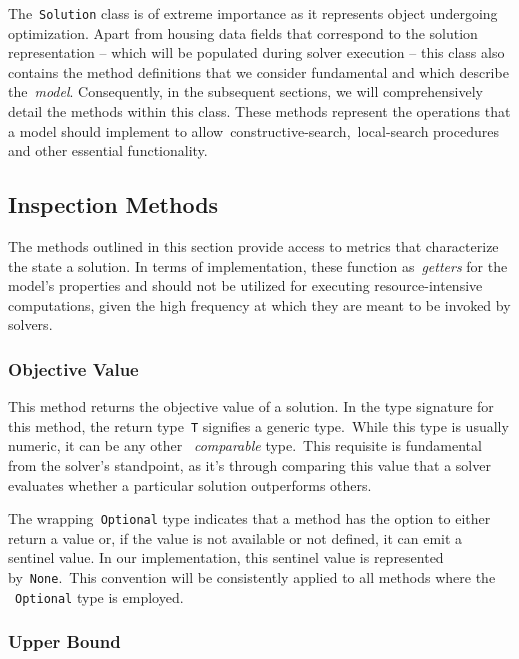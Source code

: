The~\texttt{Solution} class is of extreme importance as it represents object
undergoing optimization. Apart from housing data fields that correspond to the
solution representation -- which will be populated during solver execution --
this class also contains the method definitions that we consider fundamental and
which describe the~\emph{model}. Consequently, in the subsequent sections, we
will comprehensively detail the methods within this class. These methods
represent the operations that a model should implement to
allow~\acrshort{constructive-search},~\acrshort{local-search} procedures and
other essential functionality.

\subsection{Inspection Methods}

The methods outlined in this section provide access to metrics that characterize
the state a solution. In terms of implementation, these function
as~\emph{getters} for the model's properties and should not be utilized for
executing resource-intensive computations, given the high frequency at which
they are meant to be invoked by solvers.

\subsubsection*{Objective Value}

\begin{center}
\end{center}

This method returns the objective value of a solution. In the type signature for
this method, the return type~\texttt{T} signifies a generic type.~While this
type is usually numeric, it can be any other ~\emph{comparable} type.~This
requisite is fundamental from the solver's standpoint, as it's through comparing
this value that a solver evaluates whether a particular solution outperforms
others.

The wrapping~\texttt{Optional} type indicates that a method has the option to
either return a value or, if the value is not available or not defined, it can
emit a sentinel value. In our implementation, this sentinel value is represented
by~\texttt{None}.~This convention will be consistently applied to all methods
where the ~\texttt{Optional} type is employed.

\subsubsection*{Upper Bound}

